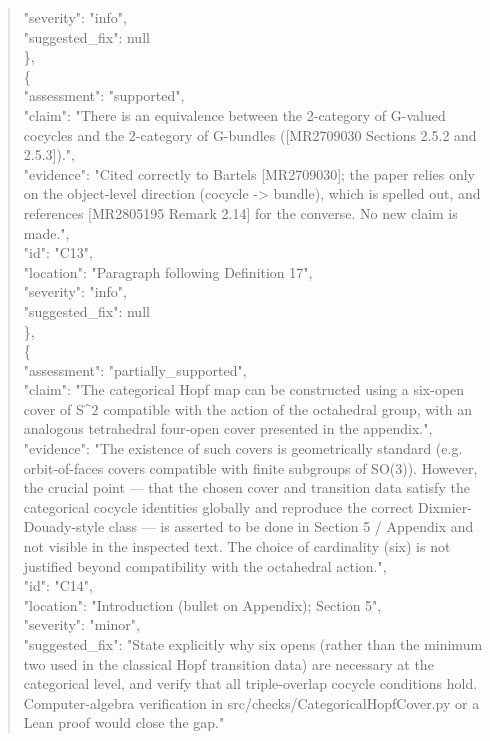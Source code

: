 \documentclass[11pt]{article}
\begin{document}
\begin{quote}
      "severity": "info",\\
      "suggested\_fix": null\\
    \},\\
    \{\\
      "assessment": "supported",\\
      "claim": "There is an equivalence between the 2-category of G-valued cocycles and the 2-category of G-bundles ([MR2709030 Sections 2.5.2 and 2.5.3]).",\\
      "evidence": "Cited correctly to Bartels [MR2709030]; the paper relies only on the object-level direction (cocycle -> bundle), which is spelled out, and references [MR2805195 Remark 2.14] for the converse. No new claim is made.",\\
      "id": "C13",\\
      "location": "Paragraph following Definition 17",\\
      "severity": "info",\\
      "suggested\_fix": null\\
    \},\\
    \{\\
      "assessment": "partially\_supported",\\
      "claim": "The categorical Hopf map can be constructed using a six-open cover of S\^{}2 compatible with the action of the octahedral group, with an analogous tetrahedral four-open cover presented in the appendix.",\\
      "evidence": "The existence of such covers is geometrically standard (e.g. orbit-of-faces covers compatible with finite subgroups of SO(3)). However, the crucial point --- that the chosen cover and transition data satisfy the categorical cocycle identities globally and reproduce the correct Dixmier-Douady-style class --- is asserted to be done in Section 5 / Appendix and not visible in the inspected text. The choice of cardinality (six) is not justified beyond compatibility with the octahedral action.",\\
      "id": "C14",\\
      "location": "Introduction (bullet on Appendix); Section 5",\\
      "severity": "minor",\\
      "suggested\_fix": "State explicitly why six opens (rather than the minimum two used in the classical Hopf transition data) are necessary at the categorical level, and verify that all triple-overlap cocycle conditions hold. Computer-algebra verification in src/checks/CategoricalHopfCover.py or a Lean proof would close the gap."\\

\end{quote}
\end{document}
